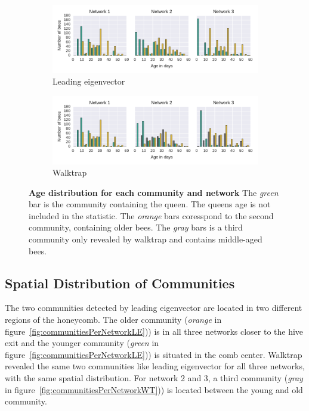 \begin{figure}[htb]
	\centering
	\begin{subfigure}[b]{1.0\textwidth}
		\centering
		\includegraphics[width=1.0\textwidth]{Figures/ageDistribution-LE}
		\caption[Leading eigenvector]{Leading eigenvector}
		\label{fig:ageLE}
		\vspace*{5mm}
	\end{subfigure}
	\begin{subfigure}[b]{1.0\textwidth}	
		\centering
		\includegraphics[width=1.0\textwidth]{Figures/ageDistribution-WT}
		\caption[Walktrap]{Walktrap}
		\label{fig:ageWT}
		\vspace*{5mm}
	\end{subfigure}
	\caption[Age distribution for each community and network] {\textbf{Age distribution for each community and network} The \emph{green} bar is the community containing the queen. The queens age is not included in the statistic. The \emph{orange} bars coresspond to the second community, containing older bees. The \emph{gray} bars is a third community only revealed by walktrap and contains middle-aged bees.}
	\label{fig:ageDistribution}
\end{figure}


\subsection{Spatial Distribution of Communities}
The two communities detected by leading eigenvector are located in two different regions of the honeycomb. The older community (\emph{orange} in figure~\ref{fig:communitiesPerNetworkLE})) is in all three networks closer to the hive exit and the younger community (\emph{green} in figure~\ref{fig:communitiesPerNetworkLE})) is situated in the comb center.
Walktrap revealed the same two communities like leading eigenvector for all three networks, with the same spatial distribution. For network 2 and 3, a third community (\emph{gray} in figure~\ref{fig:communitiesPerNetworkWT})) is located between the young and old community.

